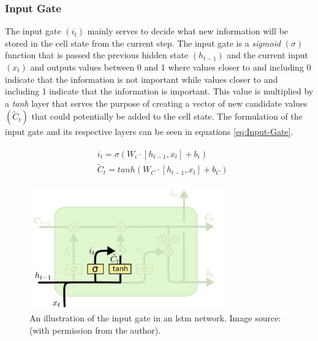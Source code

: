 \subsubsection{Input Gate}
\label{subsubsec:Background-Information:Forecasting-Models:Long-Short-Term-Memory-Networks:Input-Gate}
The input gate $(i_t)$ mainly serves to decide what new information will be stored in the cell state from the current step. The input gate is a \textit{sigmoid} $(\sigma)$ function that is passed the previous hidden state $(h_{t-1})$ and the current input $(x_t)$ and outputs values between 0 and 1 where values closer to and including 0 indicate that the information is not important while values closer to and including 1 indicate that the information is important. This value is multiplied by a \textit{tanh} layer that serves the purpose of creating a vector of new candidate values $(\tilde{C}_t)$ that could potentially be added to the cell state. The formulation of the input gate and its respective layers can be seen in equations \ref{eq:Input-Gate}.

\begin{align}
    \begin{split}
        & i_t = \sigma (W_i \cdot \left[h_{t-1}, x_t \right] + b_i) \\
        & \tilde{C}_t = tanh (W_C \cdot \left[h_{t-1}, x_t \right] + b_C)
    \end{split}
\label{eq:Input-Gate}
\end{align}

\begin{figure}[hbt!]
    \centering
    \includegraphics[width=0.75\textwidth]{Images/Chapter 3/LSTM/LSTM-Input-Gate-Illustration.pdf}
    \caption{An illustration of the input gate in an \gls{lstm} network. Image source: \cite{Colah} (with permission from the author).}
    \label{fig:LSTM-Input-Gate-Illustration}
\end{figure}

